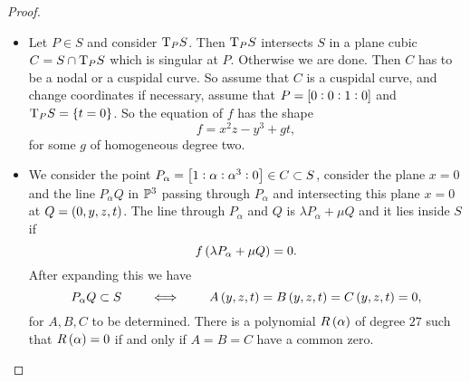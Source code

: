 \begin{proof}
\hfill
\begin{itemize}
\item Let $ P \in S $ and consider $ \mathrm{T}_P S $. Then $ \mathrm{T}_P S $ intersects $ S $ in a plane cubic $ C = S \cap \mathrm{T}_P S $ which is singular at $ P $. Otherwise we are done. Then $ C $ has to be a nodal or a cuspidal curve. So assume that $ C $ is a cuspidal curve, and change coordinates if necessary, assume that $ P = \sbr{0 : 0 : 1 : 0} $ and $ \T_P S = \cbr{t = 0} $. So the equation of $ f $ has the shape
$$ f = x^2z - y^3 + gt, $$
for some $ g $ of homogeneous degree two.
\item We consider the point $ P_\alpha = \sbr{1 : \alpha : \alpha^3 : 0} \in C \subset S $, consider the plane $ x = 0 $ and the line $ P_\alpha Q $ in $ \mathbb{P}^3 $ passing through $ P_\alpha $ and intersecting this plane $ x = 0 $ at $ Q = \br{0, y, z, t} $. The line through $ P_\alpha $ and $ Q $ is $ \lambda P_\alpha + \mu Q $ and it lies inside $ S $ if
$$ f\br{\lambda P_\alpha + \mu Q} = 0. $$
After expanding this we have
$$ P_\alpha Q \subset S \qquad \iff \qquad A\br{y, z, t} = B\br{y, z, t} = C\br{y, z, t} = 0, $$
for $ A, B, C $ to be determined. There is a polynomial $ R\br{\alpha} $ of degree $ 27 $ such that $ R\br{\alpha} = 0 $ if and only if $ A = B = C $ have a common zero.

\pagebreak



\end{itemize}
\end{proof}
